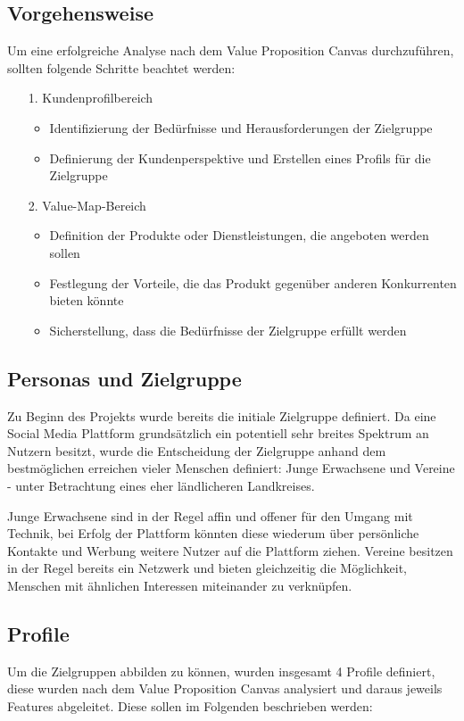 \subsection*{Vorgehensweise}

Um eine erfolgreiche Analyse nach dem Value Proposition Canvas durchzuführen, sollten folgende Schritte beachtet werden:

\begin{itemize}
    \item[1.] Kundenprofilbereich 
    \begin{itemize}
        \item Identifizierung der Bedürfnisse und Herausforderungen der Zielgruppe
        \item Definierung der Kundenperspektive und Erstellen eines Profils für die Zielgruppe
    \end{itemize}
    \item[2.] Value-Map-Bereich
    \begin{itemize}
            \item Definition der Produkte oder Dienstleistungen, die angeboten werden sollen
            \item Festlegung der Vorteile, die das Produkt gegenüber anderen Konkurrenten bieten könnte
            \item Sicherstellung, dass die Bedürfnisse der Zielgruppe erfüllt werden
    \end{itemize}
\end{itemize}

\subsection{Personas und Zielgruppe}
Zu Beginn des Projekts wurde bereits die initiale Zielgruppe definiert. Da eine Social Media Plattform grundsätzlich ein potentiell sehr breites Spektrum an Nutzern besitzt, wurde die Entscheidung der Zielgruppe anhand dem bestmöglichen erreichen vieler Menschen definiert: Junge Erwachsene und Vereine - unter Betrachtung eines eher ländlicheren Landkreises.

Junge Erwachsene sind in der Regel affin und offener für den Umgang mit Technik, bei Erfolg der Plattform könnten diese wiederum über persönliche Kontakte und Werbung weitere Nutzer auf die Plattform ziehen. Vereine besitzen in der Regel bereits ein Netzwerk und bieten gleichzeitig die Möglichkeit, Menschen mit ähnlichen Interessen miteinander zu verknüpfen.

\subsection{Profile}
Um die Zielgruppen abbilden zu können, wurden insgesamt 4 Profile definiert, diese wurden nach dem Value Proposition Canvas analysiert und daraus jeweils Features abgeleitet. Diese sollen im Folgenden beschrieben werden:

